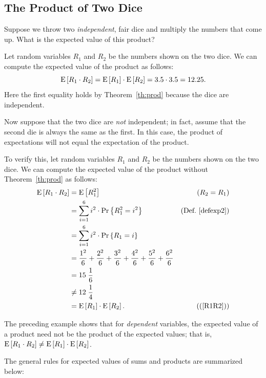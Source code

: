 \documentclass[11pt,twoside]{article}
\begin{document}
\subsection{The Product of Two Dice}

Suppose we throw two \emph{independent}, fair dice and multiply the
numbers that come up.  What is the expected value of this product?

Let random variables $R_1$ and $R_2$ be the numbers shown on the two
dice.  We can compute the expected value of the product as follows:
\begin{displaymath}\label{R1R2}
  \mathop{\textup{E}}\nolimits\left[R_1 \cdot R_2\right]
  = \mathop{\textup{E}}\nolimits\left[R_1\right] \cdot \mathop{\textup{E}}\nolimits\left[R_2\right]
  = 3.5 \cdot 3.5
  = 12.25.
\end{displaymath}
Here the first equality holds by Theorem~\ref{th:prod} because the dice
are independent.

Now suppose that the two dice are \emph{not} independent; in fact, assume
that the second die is always the same as the first.  In this case, the
product of expectations will not equal the expectation of the product.

To verify this, let random variables $R_1$ and $R_2$ be the numbers shown
on the two dice.  We can compute the expected value of the product without
Theorem~\ref{th:prod} as follows:
\begin{align*}
\mathop{\textup{E}}\nolimits\left[R_1 \cdot R_2\right] & = \mathop{\textup{E}}\nolimits\left[R_1^2\right] & (R_2 = R_1)\\
        & =    \sum_{i=1}^6 i^2 \cdot \mathop{\textup{Pr}}\nolimits\left\{R_{1}^2 = i^2\right\}
                    & \text{(Def.~\ref{defexp2})} \\
        & =    \sum_{i=1}^6 i^2 \cdot \mathop{\textup{Pr}}\nolimits\left\{R_{1} = i\right\}\\
        & =    \frac{1^2}{6} + \frac{2^2}{6} + \frac{3^2}{6} + 
                \frac{4^2}{6} + \frac{5^2}{6} + \frac{6^2}{6} \\
        & =    15\; \frac{1}{6}\\
        & \neq  12 \; \frac{1}{4}\\
        & = \mathop{\textup{E}}\nolimits\left[R_1\right] \cdot \mathop{\textup{E}}\nolimits\left[R_2\right]. & \text{((\ref{R1R2}))}
\end{align*}


\iffalse
The preceding example shows that for \emph{dependent} variables,
the expected value of a product need not be the product of the
expected values; that is, $\mathop{\textup{E}}\nolimits\left[R_1 \cdot R_2\right] \neq \mathop{\textup{E}}\nolimits\left[R_1\right] \cdot
\mathop{\textup{E}}\nolimits\left[R_2\right]$.

The general rules for expected values of sums and products
are summarized below:
\end{document}
